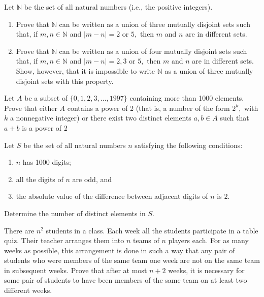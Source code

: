 \documentclass{pset}
\begin{document}
\begin{problems}
\begin{problem}[IrMO 1998 Q8]
    Let \(\mathbb{N}\) be the set of all natural numbers (i.e., the positive integers).
    \begin{enumerate}
        \item Prove that \(\mathbb{N}\) can be written as a union of three mutually disjoint sets such that, if \(m, n \in \mathbb{N}\) and \(|m-n|=2\) or \(5,\) then \(m\) and \(n\) are in different sets.
    \item Prove that \(\mathbb{N}\) can be written as a union of four mutually disjoint sets such that, if \(m, n \in \mathbb{N}\) and \(|m-n|=2,3\) or \(5,\) then \(m\) and \(n\) are in different sets. Show, however, that it is impossible to write \(\mathbb{N}\) as a union of three mutually disjoint sets with this property.
    \end{enumerate}
    
\end{problem}

\begin{problem}[IrMO 1997 Q8]
    Let \(A\) be a subset of \(\{0,1,2,3, \ldots, 1997\}\) containing more than 1000 elements. Prove that either \(A\) contains a power of 2 (that is, a number of the form \(2^{k},\) with \(k\) a nonnegative integer) or there exist two distinct elements \(a, b \in A\) such that \(a+b\) is a power of 2
\end{problem}

\begin{problem}[IrMO 1997 Q9]
    Let \(S\) be the set of all natural numbers \(n\) satisfying the following conditions:
    \begin{enumerate}
    \item \(n\) has 1000 digits;
    \item all the digits of \(n\) are odd, and
    \item the absolute value of the difference between adjacent digits of \(n\) is \(2 .\)
\end{enumerate}
    Determine the number of distinct elements in \(S\).
\end{problem}

\begin{problem}[IrMO 1995 Q1]
    There are \(n^{2}\) students in a class. Each week all the students participate in a table quiz. Their teacher arranges them into \(n\) teams of \(n\) players each. For as many weeks as possible, this arrangement is done in such a way that any pair of students who were members of the same team one week are not on the same team in subsequent weeks. Prove that after at most \(n+2\) weeks, it is necessary for some pair of students to have been members of the same team on at least two different weeks.
\end{problem}


\end{problems}
\end{document}
